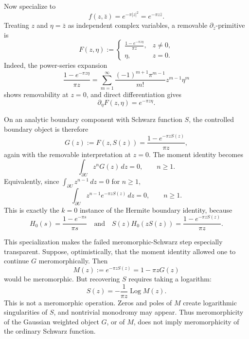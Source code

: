 \documentclass[11pt]{article}
\newcommand{\dd}{\,d}
\newcommand{\pbar}{\partial_{\bar z}}
\newcommand{\1}{\mathbf 1}
\newcommand{\Log}{\operatorname{Log}}
\begin{document}
Now specialize to
\[
  f(z,\bar z)=e^{-\pi |z|^2}=e^{-\pi z\bar z}.
\]
Treating \(z\) and \(\eta=\bar z\) as independent complex variables, a removable
\(\pbar\)-primitive is
\begin{equation}\label{eq:gaussian-primitive}
  F(z,\eta):=
  \begin{cases}
  \displaystyle \frac{1-e^{-\pi z\eta}}{\pi z}, & z\ne0,\\[1.1em]
  \eta, & z=0.
  \end{cases}
\end{equation}
Indeed, the power-series expansion
\[
  \frac{1-e^{-\pi z\eta}}{\pi z}
  =
  \sum_{m=1}^\infty \frac{(-1)^{m+1}\pi^{m-1}}{m!}z^{m-1}\eta^m
\]
shows removability at \(z=0\), and direct differentiation gives
\[
  \partial_\eta F(z,\eta)=e^{-\pi z\eta}.
\]

On an analytic boundary component with Schwarz function \(S\), the controlled boundary
object is therefore
\begin{equation}\label{eq:gaussian-G}
  G(z):=F(z,S(z))
  =
  \frac{1-e^{-\pi zS(z)}}{\pi z},
\end{equation}
again with the removable interpretation at \(z=0\). The moment identity becomes
\begin{equation}\label{eq:gaussian-boundary-moment}
  \int_{\partial U} z^n G(z)\dd z=0,\qquad n\ge1.
\end{equation}
Equivalently, since \(\int_{\partial U}z^{n-1}\dd z=0\) for \(n\ge1\),
\begin{equation}\label{eq:gaussian-exp-boundary}
  \int_{\partial U}z^{n-1}e^{-\pi zS(z)}\dd z=0,\qquad n\ge1.
\end{equation}
This is exactly the \(k=0\) instance of the Hermite boundary identity, because
\[
  H_0(s)=\frac{1-e^{-\pi s}}{\pi s}
  \quad\text{and}\quad
  S(z)H_0(zS(z))
  =
  \frac{1-e^{-\pi zS(z)}}{\pi z}.
\]

This specialization makes the failed meromorphic-Schwarz step especially transparent.
Suppose, optimistically, that the moment identity allowed one to continue \(G\)
meromorphically. Then
\begin{equation}\label{eq:gaussian-M}
  M(z):=e^{-\pi zS(z)}=1-\pi zG(z)
\end{equation}
would be meromorphic. But recovering \(S\) requires taking a logarithm:
\begin{equation}\label{eq:S-from-M}
  S(z)=-\frac{1}{\pi z}\Log M(z).
\end{equation}
This is not a meromorphic operation. Zeros and poles of \(M\) create logarithmic
singularities of \(S\), and nontrivial monodromy may appear. Thus meromorphicity of the
Gaussian weighted object \(G\), or of \(M\), does not imply meromorphicity of the ordinary
Schwarz function.
\end{document}
